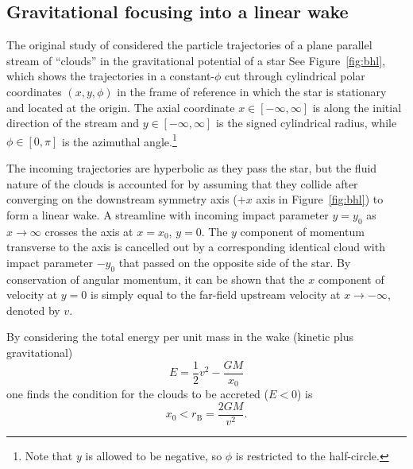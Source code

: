 \documentclass[useAMS, usenatbib, a4paper]{mnras}
\newcommand\bhl{\ensuremath{_{\mathrm{\scriptscriptstyle B}}}}
\begin{document}
\subsection{Gravitational focusing into a linear wake}
\label{sec:grav-focus-into}

The original study of \citet{Hoyle:1939a} considered the
particle trajectories of a plane parallel stream of ``clouds'' in the
gravitational potential of a star
See Figure~\ref{fig:bhl}, which shows the trajectories in a
constant-\(\phi\) cut through cylindrical polar
coordinates \((x, y, \phi)\) in the frame of reference in which the star is stationary
and located at the origin. 
The axial coordinate \(x \in [-\infty, \infty]\) is along the initial direction of the stream
and \(y  \in [-\infty, \infty]\) is the signed cylindrical radius, while \(\phi \in [0, \pi]\) is
the azimuthal angle.\footnote{Note that \(y\) is allowed to be negative, so \(\phi\) is restricted to the half-circle.}

The incoming trajectories are hyperbolic as they pass the star,
but the fluid nature of the clouds is accounted for
by assuming that they collide after converging on the downstream symmetry axis
(\(+x\) axis in Figure~\ref{fig:bhl})
to form a linear wake.
A streamline with incoming impact parameter \(y = y_0\) as \(x \to \infty\)
crosses the axis at \(x = x_0\), \(y = 0\).
The \(y\) component of momentum transverse to the axis is cancelled out by
a corresponding identical cloud with impact parameter \(-y_0\)
that passed on the opposite side of the star.
By conservation of angular momentum,
it can be shown that the \(x\) component of velocity at \(y = 0\)
is simply equal to the far-field upstream velocity at \(x \to -\infty\),
denoted by \(v\).

By considering the total energy per unit mass in the wake (kinetic plus gravitational)
\begin{equation}
  \label{eq:total-energy}
  E = \frac12 v^2 - \frac{G M}{x_0}
\end{equation}
one finds the condition for the clouds to be accreted (\(E < 0\)) is 
\begin{equation}
  \label{eq:x-accretion-condition}
  x_0 < r\bhl = \frac{2 G M}{v^2} .
\end{equation}
\end{document}
